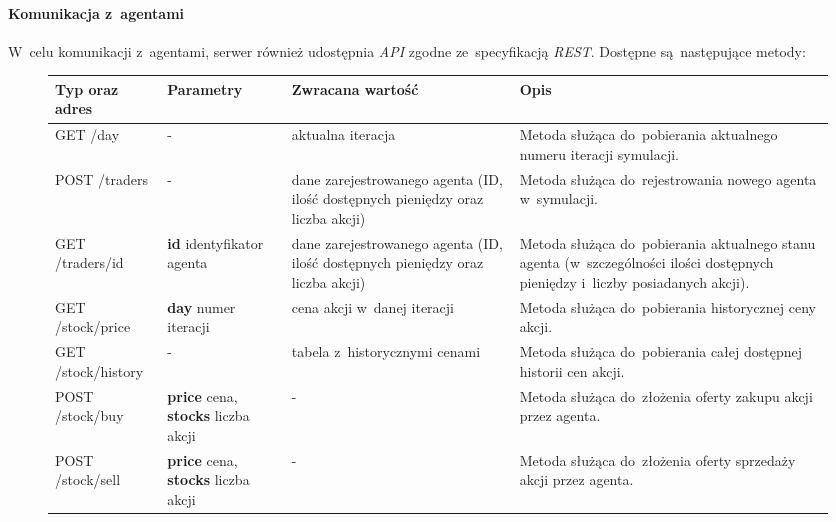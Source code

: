\documentclass[11pt,a4paper]{article}
\begin{document}
\newpage
\paragraph{Komunikacja z~agentami}
W~celu komunikacji z~agentami, serwer również udostępnia \textit{API} zgodne ze~specyfikacją \textit{REST}. Dostępne są~następujące metody:
\begin{figure}[H]
  \begin{tabularx}{\textwidth}{ |p{2.5cm}|p{3.4cm}|p{3cm}|X| }
    \hline \textbf{Typ oraz \newline adres} & \textbf{Parametry} & \textbf{Zwracana \newline wartość} & \textbf{Opis} \\ \hline
    GET \newline /day & - & aktualna iteracja & Metoda służąca do~pobierania aktualnego numeru iteracji symulacji. \\ \hline
    POST \newline /traders & - & dane zarejestrowanego agenta (ID, ilość dostępnych pieniędzy oraz liczba akcji) & Metoda służąca do~rejestrowania nowego agenta w~symulacji. \\ \hline
    GET \newline /traders/id & \textbf{id} identyfikator agenta & dane zarejestrowanego agenta (ID, ilość dostępnych pieniędzy oraz liczba akcji) & Metoda służąca do~pobierania aktualnego stanu agenta (w~szczególności ilości dostępnych pieniędzy i~liczby posiadanych akcji). \\ \hline
    GET \newline /stock/price & \textbf{day} numer iteracji & cena akcji w~danej iteracji & Metoda służąca do~pobierania historycznej ceny akcji. \\ \hline
    GET \newline /stock/history & - & tabela z~historycznymi cenami & Metoda służąca do~pobierania całej dostępnej historii cen akcji. \\ \hline
    POST \newline /stock/buy & \textbf{price} cena, \newline \textbf{stocks} liczba akcji & - & Metoda służąca do~złożenia oferty zakupu akcji przez agenta. \\ \hline
    POST \newline /stock/sell & \textbf{price} cena, \newline \textbf{stocks} liczba akcji & - & Metoda służąca do~złożenia oferty sprzedaży akcji przez agenta. \\ \hline
  \end{tabularx}
\end{figure}
\end{document}
